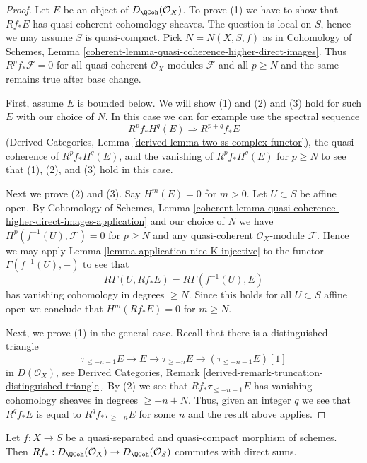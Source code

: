 \begin{proof}
Let $E$ be an object of $D_\QCoh(\mathcal{O}_X)$. To prove (1) we have to
show that $Rf_*E$ has quasi-coherent cohomology sheaves. The question is local
on $S$, hence we may assume $S$ is quasi-compact. Pick $N = N(X, S, f)$ as in
Cohomology of Schemes, Lemma
\ref{coherent-lemma-quasi-coherence-higher-direct-images}.
Thus $R^pf_*\mathcal{F} = 0$ for all quasi-coherent $\mathcal{O}_X$-modules
$\mathcal{F}$ and all $p \geq N$ and the same remains true after base change.

\medskip\noindent
First, assume $E$ is bounded below. We will show (1) and (2) and (3) hold
for such $E$ with our choice of $N$. In this case we can for example use the
spectral sequence
$$
R^pf_*H^q(E) \Rightarrow R^{p + q}f_*E
$$
(Derived Categories, Lemma \ref{derived-lemma-two-ss-complex-functor}),
the quasi-coherence of $R^pf_*H^q(E)$, and the vanishing of $R^pf_*H^q(E)$
for $p \geq N$ to see that (1), (2), and (3) hold in this case.

\medskip\noindent
Next we prove (2) and (3). Say $H^m(E) = 0$ for $m > 0$.
Let $U \subset S$ be affine open. By Cohomology of Schemes, Lemma
\ref{coherent-lemma-quasi-coherence-higher-direct-images-application}
and our choice of $N$
we have $H^p(f^{-1}(U), \mathcal{F}) = 0$ for $p \geq N$
and any quasi-coherent $\mathcal{O}_X$-module $\mathcal{F}$.
Hence we may apply Lemma \ref{lemma-application-nice-K-injective}
to the functor $\Gamma(f^{-1}(U), -)$ to see that
$$
R\Gamma(U, Rf_*E) = R\Gamma(f^{-1}(U), E)
$$
has vanishing cohomology in degrees $\geq N$. Since this holds for
all $U \subset S$ affine open we conclude that $H^m(Rf_*E) = 0$
for $m \geq N$.

\medskip\noindent
Next, we prove (1) in the general case. Recall that there is a
distinguished triangle
$$
\tau_{\leq -n - 1}E \to E \to \tau_{\geq -n}E \to
(\tau_{\leq -n - 1}E)[1]
$$
in $D(\mathcal{O}_X)$, see Derived Categories, Remark
\ref{derived-remark-truncation-distinguished-triangle}.
By (2) we see that $Rf_*\tau_{\leq -n - 1}E$
has vanishing cohomology sheaves in degrees $\geq -n + N$.
Thus, given an integer $q$ we see that $R^qf_*E$ is equal
to $R^qf_*\tau_{\geq -n}E$ for some $n$ and the result
above applies.
\end{proof}

\begin{lemma}
\label{lemma-quasi-coherence-pushforward-direct-sums}
Let $f : X \to S$ be a quasi-separated and quasi-compact morphism of
schemes. Then
$Rf_* : D_\QCoh(\mathcal{O}_X) \to D_\QCoh(\mathcal{O}_S)$
commutes with direct sums.
\end{lemma}

